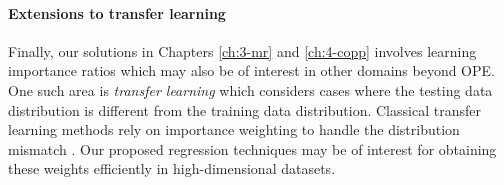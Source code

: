 \paragraph*{Extensions to transfer learning}
Finally, our solutions in Chapters \ref*{ch:3-mr} and \ref*{ch:4-copp} involves learning importance ratios which may also be of interest in other domains beyond OPE. 
One such area is \emph{transfer learning} which considers cases where the testing data distribution is different from the training data distribution. 
Classical transfer learning methods rely on importance weighting to handle the distribution mismatch \citep{SHIMODAIRA2000Improving, sugiyama2007covariate, huang2007correcting, sugiyama2008direct,lu2021rethinking}. 
Our proposed regression techniques may be of interest for obtaining these weights efficiently in high-dimensional datasets.  

